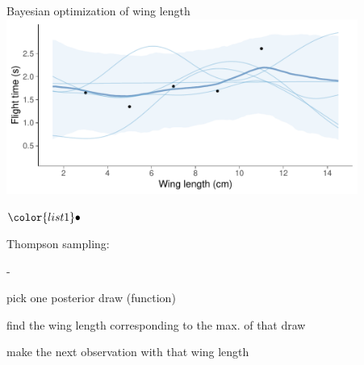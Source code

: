 \documentclass[t]{beamer}
\newenvironment{list1}{
   \begin{list}{$\color{list1}\bullet$}{\itemsep=6pt}}{
  \end{list}}
\newenvironment{list2}{
  \begin{list}{-}{\baselineskip=12pt\itemsep=2pt}}{
  \end{list}}
\begin{document}
\begin{frame}{Bayesian optimization of wing length}
{  \hspace{-8mm}\includegraphics[width=11.5cm]{helicopter_bo_a_1.pdf}\\}

{\vspace{-0.5\baselineskip}}
\begin{list1}
  \item<4-> Thompson sampling:
    \begin{list2}
    \item pick one posterior draw (function)
    \item find the wing length corresponding to the max. of that draw
    \item make the next observation with that wing length
    \end{list2}
  \end{list1}
  
\end{frame}
\end{document}
